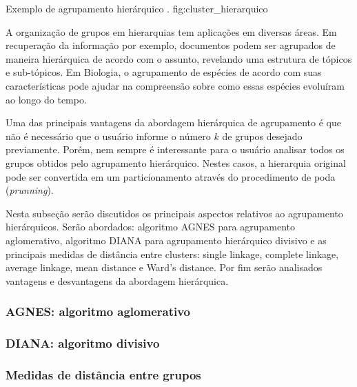{Exemplo de agrupamento hierárquico \cite{tan2009introducao}.}
{fig:cluster_hierarquico}

A organização de grupos em hierarquias tem aplicações em diversas áreas. Em 
recuperação da informação por exemplo, documentos podem ser agrupados de maneira
hierárquica de acordo com o assunto, revelando uma estrutura de tópicos e
sub-tópicos. Em Biologia, o agrupamento de espécies de acordo com suas
características pode ajudar na compreensão sobre como essas espécies evoluíram
ao longo do tempo.

Uma das principais vantagens da abordagem hierárquica de agrupamento é que não
é necessário que o usuário informe o número $k$ de grupos desejado previamente.
Porém, nem sempre é interessante para o usuário analisar todos os grupos obtidos
pelo agrupamento hierárquico. Nestes casos, a hierarquia original pode ser
convertida em um particionamento através do procedimento de poda
(\emph{prunning}). 

Nesta subseção serão discutidos os principais aspectos relativos ao agrupamento
hierárquicos. Serão abordados: algoritmo AGNES para agrupamento aglomerativo, 
algoritmo DIANA para agrupamento hierárquico divisivo e as principais medidas
de distância entre clusters: single linkage, complete linkage, average linkage,
mean distance e Ward's distance. Por fim serão analisados vantagens e
desvantagens da abordagem hierárquica.

\subsubsection{AGNES: algoritmo aglomerativo}

\subsubsection{DIANA: algoritmo divisivo}

\subsubsection{Medidas de distância entre grupos}





